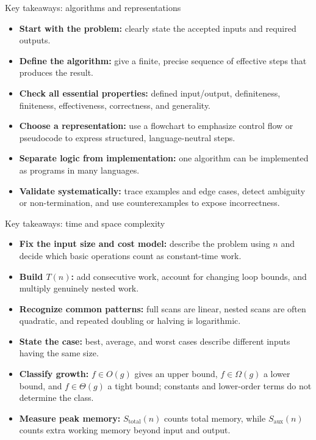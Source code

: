 \documentclass[aspectratio=169]{beamer}
\begin{document}
\begin{frame}{Key takeaways: algorithms and representations}
  \small
  \begin{itemize}
    \setlength{\itemsep}{0.75em}
    \item \textbf{\color{ForestGreen}Start with the problem:} clearly state the
      accepted inputs and required outputs.
    \item \textbf{\color{ForestGreen}Define the algorithm:} give a finite,
      precise sequence of effective steps that produces the result.
    \item \textbf{\color{ForestGreen}Check all essential properties:} defined
      input/output, definiteness, finiteness, effectiveness, correctness, and
      generality.
    \item \textbf{\color{ForestGreen}Choose a representation:} use a flowchart
      to emphasize control flow or pseudocode to express structured,
      language-neutral steps.
    \item \textbf{\color{ForestGreen}Separate logic from implementation:} one
      algorithm can be implemented as programs in many languages.
    \item \textbf{\color{ForestGreen}Validate systematically:} trace examples
      and edge cases, detect ambiguity or non-termination, and use
      counterexamples to expose incorrectness.
  \end{itemize}
\end{frame}

\begin{frame}{Key takeaways: time and space complexity}
  \small
  \begin{itemize}
    \setlength{\itemsep}{0.25em}
    \item \textbf{\color{ForestGreen}Fix the input size and cost model:}
      describe the problem using $n$ and decide which basic operations count as
      constant-time work.
    \item \textbf{\color{ForestGreen}Build $T(n)$:} add consecutive work,
      account for changing loop bounds, and multiply genuinely nested work.
    \item \textbf{\color{ForestGreen}Recognize common patterns:} full scans are
      linear, nested scans are often quadratic, and repeated doubling or
      halving is logarithmic.
    \item \textbf{\color{ForestGreen}State the case:} best, average, and worst
      cases describe different inputs having the same size.
    \item \textbf{\color{ForestGreen}Classify growth:} $f\in O(g)$ gives an
      upper bound, $f\in\Omega(g)$ a lower bound, and $f\in\Theta(g)$ a tight
      bound; constants and lower-order terms do not determine the class.
    \item \textbf{\color{ForestGreen}Measure peak memory:}
      $S_{\mathrm{total}}(n)$ counts total memory, while
      $S_{\mathrm{aux}}(n)$ counts extra working memory beyond input and output.
  \end{itemize}
\end{frame}
\end{document}
